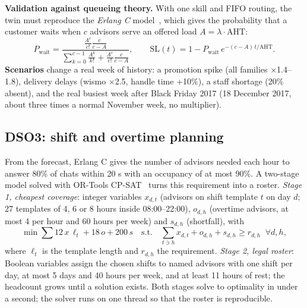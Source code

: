 \textbf{Validation against queueing theory.} With one skill and FIFO routing, the twin must reproduce the
\emph{Erlang C} model~\cite{gans}, which gives the probability that a customer waits when $c$ advisors serve
an offered load $A = \lambda \cdot \text{AHT}$:
\begin{equation}
P_{\text{wait}} = \frac{\frac{A^c}{c!}\frac{c}{c-A}}{\sum_{k=0}^{c-1}\frac{A^k}{k!} + \frac{A^c}{c!}\frac{c}{c-A}},
\qquad
\text{SL}(t) = 1 - P_{\text{wait}}\, e^{-(c-A)\,t/\text{AHT}}.
\end{equation}
\textbf{Scenarios} change a real week of history: a promotion spike (all families $\times$1.4--1.8), delivery
delays (wismo $\times$2.5, handle time +10\%), a staff shortage (20\% absent), and the real busiest week after
Black Friday 2017 (18 December 2017, about three times a normal November week, no multiplier).

\subsection{DSO3: shift and overtime planning}
From the forecast, Erlang C gives the number of advisors needed each hour to answer 80\% of chats within
20 s with an occupancy of at most 90\%. A two-stage model solved with OR-Tools CP-SAT~\cite{ortools} turns this
requirement into a roster.
\emph{Stage 1, cheapest coverage}: integer variables $x_{d,t}$ (advisors on shift template $t$ on day $d$;
27 templates of 4, 6 or 8 hours inside 08:00--22:00), $o_{d,h}$ (overtime advisors, at most 4 per hour and 60
hours per week) and $s_{d,h}$ (shortfall), with
\begin{equation}
\min \sum 12\,x\,\ell_t + 18\,o + 200\,s \quad \text{s.t.} \quad \sum_{t \ni h} x_{d,t} + o_{d,h} + s_{d,h}
\geq r_{d,h}\;\; \forall d,h,
\end{equation}
where $\ell_t$ is the template length and $r_{d,h}$ the requirement. \emph{Stage 2, legal roster}: Boolean
variables assign the chosen shifts to named advisors with one shift per day, at most 5 days and 40 hours per
week, and at least 11 hours of rest; the headcount grows until a solution exists. Both stages solve to
optimality in under a second; the solver runs on one thread so that the roster is reproducible.

